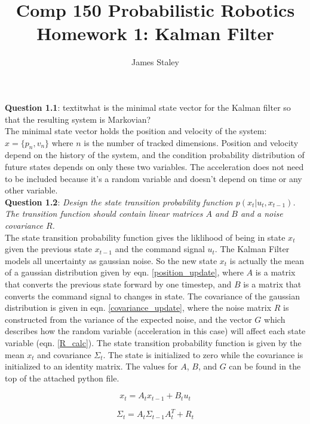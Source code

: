 \documentclass{article}
\title{Comp 150 Probabilistic Robotics Homework 1: Kalman Filter}
\author{James Staley}
\date{\vspace{-2em}}
\begin{document}
\maketitle
{\bf Question 1.1}: textit{what is the minimal state vector for the Kalman filter so that the resulting system is Markovian?}\\

The minimal state vector holds the position and velocity of the system: $x = \{p_n, v_n\}$ where $n$ is the number of tracked dimensions. Position and velocity depend on the history of the system, and the condition probability distribution of future states depends on only these two variables. The acceleration does not need to be included because it's a random variable and doesn't depend on time or any other variable.  \\

{\bf Question 1.2}: \textit{Design the state transition probability function $p(x_t | u_t, x_{t-1})$. The transition function should contain linear matrices $A$ and $B$ and a noise covariance $R$.}\\

The state transition probability function gives the liklihood of being in state $x_t$ given the previous state $x_{t-1}$ and the command signal $u_t$. The Kalman Filter models all uncertainty as gaussian noise. So the new state $x_t$ is actually the mean of a gaussian distribution given by eqn. \ref{position_update}, where $A$ is a matrix that converts the previous state forward by one timestep, and $B$ is a matrix that converts the command signal to changes in state. The covariance of the gaussian distribution is given in eqn. \ref{covariance_update}, where the noise matrix $R$ is constructed from the variance of the expected noise, and the vector $G$ which describes how the random variable (acceleration in this case) will affect each state variable (eqn. \ref{R_calc}). The state transition probability function is given by the mean $x_t$ and covariance $\Sigma_t$. The state is initialized to zero while the covariance is initialized to an identity matrix. The values for $A$, $B$, and $G$ can be found in the top of the attached python file.

\begin{equation}\label{position_update}
    x_t = A_t x_{t-1} + B_t u_t
\end{equation}

\begin{equation}\label{covariance_update}
    \Sigma_t = A_t \Sigma_{t-1} A^T_t + R_t
\end{equation}
\end{document}
